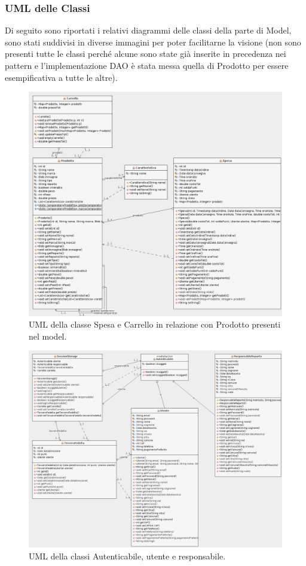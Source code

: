\documentclass{article}
\begin{document}
\subsubsection{UML delle Classi}
Di seguito sono riportati i relativi diagrammi delle classi della parte di Model, sono stati suddivisi in diverse immagini per poter facilitarne la visione (non sono presenti tutte le classi perché alcune sono state già inserite in precedenza nei pattern e l'implementazione DAO è stata messa quella di Prodotto per essere esempificativa a tutte le altre).
\begin{figure}[h!]
	\centering
	\includegraphics[width=\textwidth]{UmlSpesa.png}
	\caption{UML della classe Spesa e Carrello in relazione con Prodotto presenti nel model.}
	\label{fig:UmlSpesa}
\end{figure}
\begin{figure}[h!]
	\centering
	\includegraphics[width=\textwidth]{UmlAutenticabile.png}
	\caption{UML della classi Autenticabile, utente e responsabile.}
	\label{fig:UmlAutenticabile}
\end{figure}
\end{document}
